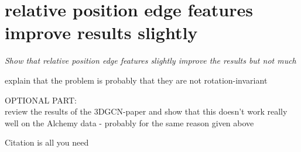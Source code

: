 \section{relative position edge features improve results slightly}

{\itshape
 Show that relative position edge features slightly improve the results but not much
 
 explain that the problem is probably that they are not rotation-invariant
	
	
OPTIONAL PART:\\
review the results of the 3DGCN-paper and show that this doesn't work really well on the Alchemy data - probably for the same reason given above
	}
	
	

Citation is all you need~\cite{Vaswani2017}

